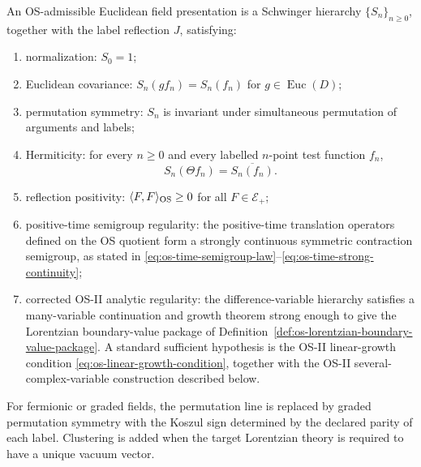 \begin{definition}
\label{def:os-admissible-euclidean-data}
An OS-admissible Euclidean field presentation is a Schwinger hierarchy
\(\{S_n\}_{n\ge0}\), together with the label reflection \(J\), satisfying:
\begin{enumerate}[label=(\roman*)]
  \item normalization: \(S_0=1\);
  \item Euclidean covariance: \(S_n(gf_n)=S_n(f_n)\) for
  \(g\in \operatorname{Euc}(D)\);
  \item permutation symmetry: \(S_n\) is invariant under simultaneous
  permutation of arguments and labels;
  \item Hermiticity: for every \(n\ge0\) and every labelled \(n\)-point test
  function \(f_n\),
  \begin{equation}
    S_n(\Theta f_n)
    =
    \overline{S_n(f_n)} .
    \label{eq:os-hermiticity}
  \end{equation}
  \item reflection positivity:
  \(\langle F,F\rangle_{\rm OS}\ge0\) for all \(F\in\mathcal E_+\);
  \item positive-time semigroup regularity: the positive-time translation
  operators defined on the OS quotient form a strongly continuous symmetric
  contraction semigroup, as stated in
  \eqref{eq:os-time-semigroup-law}--\eqref{eq:os-time-strong-continuity};
  \item corrected OS-II analytic regularity: the difference-variable hierarchy
  satisfies a many-variable continuation and growth theorem strong enough to
  give the Lorentzian boundary-value package of
  Definition~\ref{def:os-lorentzian-boundary-value-package}.  A standard
  sufficient hypothesis is the OS-II linear-growth condition
  \eqref{eq:os-linear-growth-condition}, together with the OS-II
  several-complex-variable construction described below.
\end{enumerate}
For fermionic or graded fields, the permutation line is replaced by graded
permutation symmetry with the Koszul sign determined by the declared parity of
each label.  Clustering is added when the target Lorentzian theory is required
to have a unique vacuum vector.
\end{definition}

